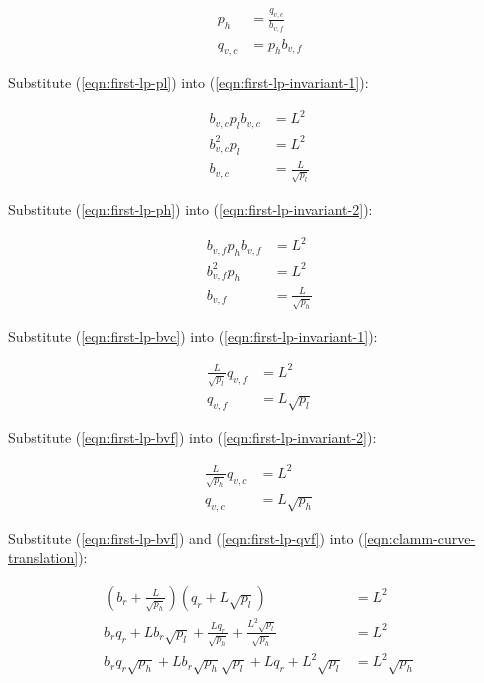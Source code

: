 \documentclass[table, twocolumn]{article}
\begin{document}
\begin{align} \label{eqn:first-lp-ph}
  p_h      & = \frac{q_{v, c}}{b_{v, f}} \nonumber \\
  q_{v, c} & = p_h b_{v, f}
\end{align}

Substitute (\ref{eqn:first-lp-pl}) into (\ref{eqn:first-lp-invariant-1}):

\begin{align} \label{eqn:first-lp-bvc}
  b_{v, c} p_l b_{v, c} & = L^2 \nonumber        \\
  b_{v, c}^2 p_l        & = L^2 \nonumber        \\
  b_{v, c}              & = \frac{L}{\sqrt{p_l}}
\end{align}

Substitute (\ref{eqn:first-lp-ph}) into (\ref{eqn:first-lp-invariant-2}):

\begin{align} \label{eqn:first-lp-bvf}
  b_{v, f} p_h b_{v, f} & = L^2 \nonumber        \\
  b_{v, f}^2 p_h        & = L^2 \nonumber        \\
  b_{v, f}              & = \frac{L}{\sqrt{p_h}}
\end{align}

Substitute (\ref{eqn:first-lp-bvc}) into (\ref{eqn:first-lp-invariant-1}):

\begin{align} \label{eqn:first-lp-qvf}
  \frac{L}{\sqrt{p_l}} q_{v, f} & = L^2 \nonumber \\
  q_{v, f}                      & = L \sqrt{p_l}
\end{align}

Substitute (\ref{eqn:first-lp-bvf}) into (\ref{eqn:first-lp-invariant-2}):

\begin{align}
  \frac{L}{\sqrt{p_h}} q_{v, c} & = L^2 \nonumber \\
  q_{v, c}                      & = L \sqrt{p_h}
\end{align}

Substitute (\ref{eqn:first-lp-bvf}) and (\ref{eqn:first-lp-qvf}) into
(\ref{eqn:clamm-curve-translation}):

\begin{align} \label{eqn:first-lp-invariant-3}
  (b_r + \frac{L}{\sqrt{p_h}})(q_r + L \sqrt{p_l})
   & = L^2 \nonumber  \\
  b_r q_r + L b_r \sqrt{p_l} + \frac{L q_r}{\sqrt{p_h}} +
  \frac{L^2 \sqrt{p_l}}{\sqrt{p_h}}
   & = L^2 \nonumber  \\
  b_r q_r \sqrt{p_h} + L b_r \sqrt{p_h} \sqrt{p_l} + L q_r + L^2 \sqrt{p_l}
   & = L^2 \sqrt{p_h}
\end{align}
\end{document}
